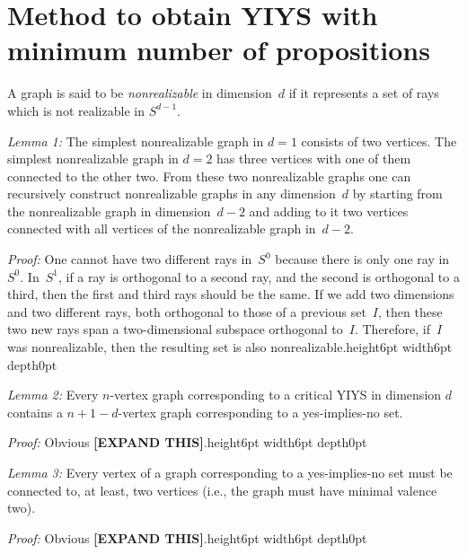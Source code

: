 \documentclass[twocolumn,aps,pra,showpacs]{revtex4-1}
\def\endproof{\vrule height6pt width6pt depth0pt}
\begin{document}

\section{Method to obtain YIYS with minimum number of propositions}


A graph is said to be {\em nonrealizable} in dimension~$d$ if
it represents a set of rays which is not realizable in
$S^{d-1}$.


{\em Lemma 1: }The simplest nonrealizable graph in $d=1$
consists of two vertices. The simplest nonrealizable graph in
$d=2$ has three vertices with one of them connected to the
other two. From these two nonrealizable graphs one can
recursively construct nonrealizable graphs in any dimension~$d$
by starting from the nonrealizable graph in dimension~$d-2$ and
adding to it two vertices connected with all vertices of the
nonrealizable graph in~$d-2$.


{\em Proof:} One cannot have two different rays in~$S^0$
because there is only one ray in~$S^0$. In~$S^1$, if a ray is
orthogonal to a second ray, and the second is orthogonal to a
third, then the first and third rays should be the same. If we
add two dimensions and two different rays, both orthogonal to
those of a previous set~$I$, then these two new rays span a
two-dimensional subspace orthogonal to~$I$. Therefore, if~$I$
was nonrealizable, then the resulting set is also
nonrealizable.\hfill\endproof


{\em Lemma 2: }Every $n$-vertex graph corresponding to a
critical YIYS in dimension $d$ contains a $n+1-d$-vertex graph
corresponding to a yes-implies-no set.

{\em Proof: }Obvious {\bf [EXPAND THIS]}.\hfill\endproof

{\em Lemma 3: }Every vertex of a graph corresponding to a
yes-implies-no set must be connected to, at least, two vertices
(i.e., the graph must have minimal valence two).

{\em Proof: }Obvious {\bf [EXPAND THIS]}.\hfill\endproof
\end{document}
